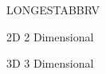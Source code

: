 \begin{theglossary}{LONGESTABBRV}

\item[2D] 2 Dimensional
\item[3D] 3 Dimensional 

\end{theglossary}

